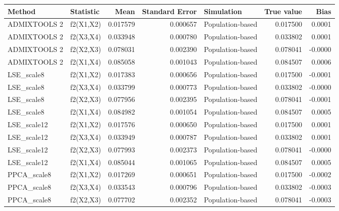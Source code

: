 \begin{tabular}{llrrlrr}
\toprule
      Method &       Statistic &     Mean &  Standard Error &                           Simulation &  True value &    Bias \\
\midrule
ADMIXTOOLS 2 &       f2(X1,X2) & 0.017579 &        0.000657 &                     Population-based &    0.017500 &  0.0001 \\
ADMIXTOOLS 2 &       f2(X3,X4) & 0.033948 &        0.000780 &                     Population-based &    0.033802 &  0.0001 \\
ADMIXTOOLS 2 &       f2(X2,X3) & 0.078031 &        0.002390 &                     Population-based &    0.078041 & -0.0000 \\
ADMIXTOOLS 2 &       f2(X1,X4) & 0.085058 &        0.001043 &                     Population-based &    0.084507 &  0.0006 \\
  LSE\_scale8 &       f2(X1,X2) & 0.017383 &        0.000656 &                     Population-based &    0.017500 & -0.0001 \\
  LSE\_scale8 &       f2(X3,X4) & 0.033799 &        0.000773 &                     Population-based &    0.033802 & -0.0000 \\
  LSE\_scale8 &       f2(X2,X3) & 0.077956 &        0.002395 &                     Population-based &    0.078041 & -0.0001 \\
  LSE\_scale8 &       f2(X1,X4) & 0.084982 &        0.001054 &                     Population-based &    0.084507 &  0.0005 \\
 LSE\_scale12 &       f2(X1,X2) & 0.017576 &        0.000650 &                     Population-based &    0.017500 &  0.0001 \\
 LSE\_scale12 &       f2(X3,X4) & 0.033949 &        0.000787 &                     Population-based &    0.033802 &  0.0001 \\
 LSE\_scale12 &       f2(X2,X3) & 0.077993 &        0.002373 &                     Population-based &    0.078041 & -0.0000 \\
 LSE\_scale12 &       f2(X1,X4) & 0.085044 &        0.001065 &                     Population-based &    0.084507 &  0.0005 \\
 PPCA\_scale8 &       f2(X1,X2) & 0.017269 &        0.000651 &                     Population-based &    0.017500 & -0.0002 \\
 PPCA\_scale8 &       f2(X3,X4) & 0.033543 &        0.000796 &                     Population-based &    0.033802 & -0.0003 \\
 PPCA\_scale8 &       f2(X2,X3) & 0.077702 &        0.002352 &                     Population-based &    0.078041 & -0.0003 \\

\end{tabular}
